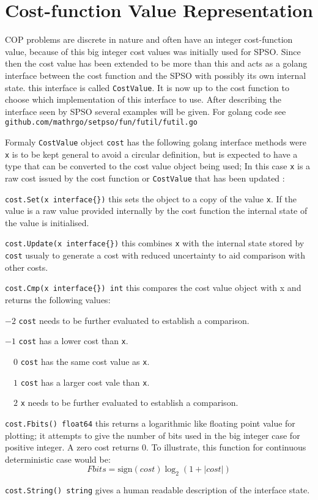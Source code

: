 \documentclass[a4paper,oneside,english]{book}
\numberwithin{equation}{section}
\numberwithin{figure}{section}
\newcommand{\codesorc}[1]{\texttt{github.com/mathrgo/setpso/#1}}
\begin{document}
\section{Cost-function Value Representation} \label{Sec:CostValue}  
COP problems are discrete in nature and often have an integer cost-function value, because of this big integer cost values was initially used for SPSO. Since then the cost value has been extended to be more than this and acts as a golang interface between the cost function and the SPSO with possibly its own internal state. this interface is called  \texttt{CostValue}. It is now up to the cost function to choose which implementation of this interface to use. After describing the interface seen by SPSO several examples will be given. For golang code see \codesorc{fun/futil/futil.go}

Formaly \texttt{CostValue} object \texttt{cost} has the following golang interface methods were \texttt{x} is to be kept general to avoid a circular definition, but is expected to  have a type that can be converted to the cost value object being used; In this case \texttt{x} is a raw cost issued by the cost function or \texttt{CostValue} that has been updated :
\begin{list}{}
	\item \texttt{cost.Set(x interface\{\})} this sets the object to a copy of the value \texttt{x}. If the  value is a raw value provided internally by the cost function the internal state of the value is initialised.
	\item \texttt{cost.Update(x interface\{\})} this combines \texttt{x} with the internal state stored by \texttt{cost} usualy to generate a cost with reduced uncertainty to aid comparison with other costs.
	\item \texttt{cost.Cmp(x interface\{\}) int} this compares the cost value object with x and returns the following values:
	\begin{list}{}
		\item $-2$ \texttt{cost} needs to be further evaluated to establish a comparison.
		\item $-1$ \texttt{cost} has a lower cost than \texttt{x}.
		\item $\quad 0$ \texttt{cost} has the same cost value as \texttt{x}.
		\item $\quad 1$ \texttt{cost} has a larger cost vale than \texttt{x}.
		\item $\quad 2$ \texttt{x} needs to be further evaluated to establish a comparison.
	\end{list}
	
	\item \texttt{cost.Fbits() float64} this returns a logarithmic like floating point value for plotting; it attempts to give the number of bits  used in the big integer case for positive integer. A zero cost returns $0$. To illustrate, this function for continuous deterministic  case  would be:
	\[ Fbits=\mathrm{sign}(cost)\log_2(1+|cost|)   \]
	\item \texttt{cost.String() string} gives a human readable description of the  interface state.
	
\end{list}
\end{document}

